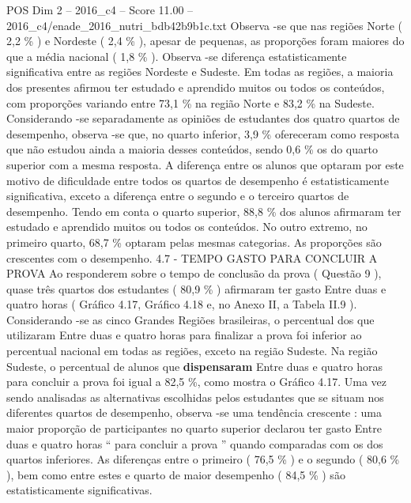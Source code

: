 \begin{textsample}{POS Dim 2 – 2016\_c4 – Score 11.00 – 2016\_c4/enade\_2016\_nutri\_bdb42b9b1c.txt}
Observa -se que nas regiões Norte ( 2,2 \% ) e Nordeste ( 2,4 \% ), apesar de pequenas, as proporções foram maiores do que a média nacional ( 1,8 \% ).
Observa -se diferença estatisticamente significativa entre as regiões Nordeste e Sudeste.
Em todas as regiões, a maioria dos presentes afirmou ter estudado e aprendido muitos ou todos os conteúdos, com proporções variando entre 73,1 \% na região Norte e 83,2 \% na Sudeste.
Considerando -se separadamente as opiniões de estudantes dos quatro quartos de desempenho, observa -se que, no quarto inferior, 3,9 \% ofereceram como resposta que não estudou ainda a maioria desses conteúdos, sendo 0,6 \% os do quarto superior com a mesma resposta.
A diferença entre os alunos que optaram por este motivo de dificuldade entre todos os quartos de desempenho é estatisticamente significativa, exceto a diferença entre o segundo e o terceiro quartos de desempenho.
Tendo em conta o quarto superior, 88,8 \% dos alunos afirmaram ter estudado e aprendido muitos ou todos os conteúdos.
No outro extremo, no primeiro quarto, 68,7 \% optaram pelas mesmas categorias.
As proporções são crescentes com o desempenho. 4.7 - TEMPO GASTO PARA CONCLUIR A PROVA Ao responderem sobre o tempo de conclusão da prova ( Questão 9 ), quase três quartos dos estudantes ( 80,9 \% ) afirmaram ter gasto Entre duas e quatro horas ( Gráfico 4.17, Gráfico 4.18 e, no Anexo II, a Tabela II.9 ).
Considerando -se as cinco Grandes Regiões brasileiras, o percentual dos que utilizaram Entre duas e quatro horas para finalizar a prova foi inferior ao percentual nacional em todas as regiões, exceto na região Sudeste.
Na região Sudeste, o percentual de alunos que \textbf{dispensaram} Entre duas e quatro horas para concluir a prova foi igual a 82,5 \%, como mostra o Gráfico 4.17.
Uma vez sendo analisadas as alternativas escolhidas pelos estudantes que se situam nos diferentes quartos de desempenho, observa -se uma tendência crescente : uma maior proporção de participantes no quarto superior declarou ter gasto Entre duas e quatro horas “ para concluir a prova ” quando comparadas com os dos quartos inferiores.
As diferenças entre o primeiro ( 76,5 \% ) e o segundo ( 80,6 \% ), bem como entre estes e quarto de maior desempenho ( 84,5 \% ) são estatisticamente significativas.

\end{textsample}
